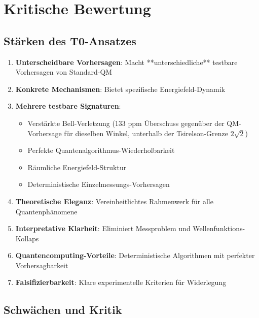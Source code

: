 	\section{Kritische Bewertung}
	
	\subsection{Stärken des T0-Ansatzes}
	
	\begin{enumerate}
		\item \textbf{Unterscheidbare Vorhersagen}: Macht **unterschiedliche** testbare Vorhersagen von Standard-QM
		\item \textbf{Konkrete Mechanismen}: Bietet spezifische Energiefeld-Dynamik
		\item \textbf{Mehrere testbare Signaturen}: 
		\begin{itemize}
			\item Verstärkte Bell-Verletzung (133 ppm Überschuss gegenüber der QM-Vorhersage für dieselben Winkel, unterhalb der Tsirelson-Grenze $2\sqrt2$)
			\item Perfekte Quantenalgorithmus-Wiederholbarkeit  
			\item Räumliche Energiefeld-Struktur
			\item Deterministische Einzelmessungs-Vorhersagen
		\end{itemize}
		\item \textbf{Theoretische Eleganz}: Vereinheitlichtes Rahmenwerk für alle Quantenphänomene
		\item \textbf{Interpretative Klarheit}: Eliminiert Messproblem und Wellenfunktions-Kollaps
		\item \textbf{Quantencomputing-Vorteile}: Deterministische Algorithmen mit perfekter Vorhersagbarkeit
		\item \textbf{Falsifizierbarkeit}: Klare experimentelle Kriterien für Widerlegung
	\end{enumerate}
	
	\subsection{Schwächen und Kritik}
	
